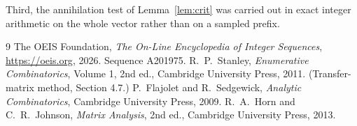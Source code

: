 \documentclass[11pt,a4paper]{article}
\theoremstyle{plain}
\theoremstyle{definition}
\begin{document}
Third, the annihilation test of Lemma~\ref{lem:crit} was carried out in exact integer
arithmetic on the whole vector rather than on a sampled prefix.

\begin{thebibliography}{9}
 The OEIS Foundation, \emph{The On-Line Encyclopedia of Integer
Sequences}, \url{https://oeis.org}, 2026. Sequence A201975.
 R.~P.~Stanley, \emph{Enumerative Combinatorics}, Volume 1, 2nd ed.,
Cambridge University Press, 2011. (Transfer-matrix method, Section 4.7.)
 P.~Flajolet and R.~Sedgewick, \emph{Analytic Combinatorics}, Cambridge
University Press, 2009.
 R.~A.~Horn and C.~R.~Johnson, \emph{Matrix Analysis}, 2nd ed., Cambridge
University Press, 2013.
\end{thebibliography}
\end{document}

